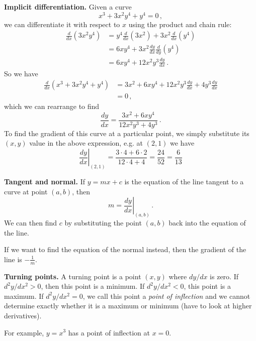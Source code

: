 \documentclass{article}
\begin{document}
\textbf{Implicit differentiation.} Given a curve
\[
x^3+3x^2y^4+y^4 = 0\,,
\]
we can differentiate it with respect to $x$ using the product and chain rule:
\begin{align*}
    \frac{d}{dx}(3x^2y^4) &= y^4\frac{d}{dx}(3x^2) + 3x^2\frac{d}{dx}(y^4)\\
    &= 6xy^4 + 3x^2\frac{dy}{dx}\frac{d}{dy}(y^4)\\
    &= 6xy^4 + 12x^2y^3\frac{dy}{dx}\,.
\end{align*}
So we have
\begin{align*}
    \frac{d}{dx}(x^3+3x^2y^4+y^4)&=3x^2+6xy^4 + 12x^2y^3\frac{dy}{dx}+4y^3\frac{dy}{dx}\\
    &=0\,,
\end{align*}
which we can rearrange to find
\[
\frac{dy}{dx} = \frac{3x^2+6xy^4}{12x^2y^3+4y^3}\,.
\]
To find the gradient of this curve at a particular point, we simply substitute its $(x,y)$ value in the above expression, e.g. at $(2,1)$ we have
\[
\left.\frac{dy}{dx}\right|_{(2,1)} = \frac{3\cdot 4+6\cdot2}{12\cdot4+4} = \frac{24}{52} = \frac{6}{13}
\]

\textbf{Tangent and normal.} If $y=mx+c$ is the equation of the line tangent to a curve at point $(a,b)$, then
\[
m=\left.\frac{dy}{dx}\right|_{(a,b)}\,.
\]
We can then find $c$ by substituting the point $(a,b)$ back into the equation of the line.

If we want to find the equation of the normal instead, then the gradient of the line is $-\frac{1}{m}$.

\textbf{Turning points.} A turning point is a point $(x,y)$ where $dy/dx$ is zero. If $d^2y/dx^2 >0$, then this point is a minimum. If $d^2y/dx^2 <0$, this point is a maximum. If $d^2y/dx^2=0$, we call this point a \emph{point of inflection} and we cannot determine exactly whether it is a maximum or minimum (have to look at higher derivatives).

For example, $y=x^3$ has a point of inflection at $x=0$.
\begin{figure}[h]
    \centering
\end{figure}
\end{document}
